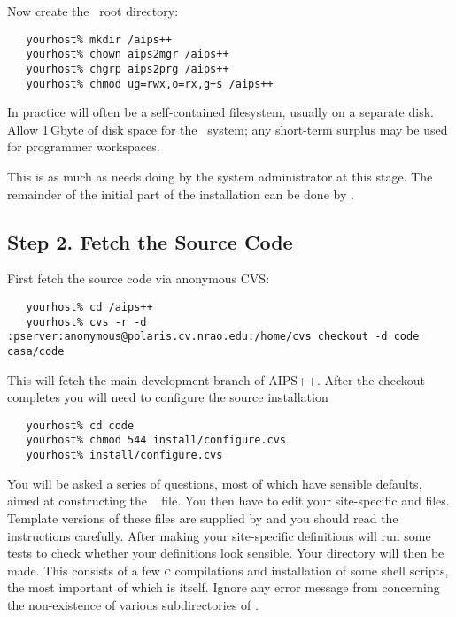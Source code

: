 Now create the \aipspp\ root directory:

\begin{verbatim}
   yourhost% mkdir /aips++
   yourhost% chown aips2mgr /aips++
   yourhost% chgrp aips2prg /aips++
   yourhost% chmod ug=rwx,o=rx,g+s /aips++
\end{verbatim}

\noindent
In practice  will often be a self-contained filesystem, usually
on a separate disk.  Allow 1\,Gbyte of disk space for the \aipspp\ system; any
short-term surplus may be used for programmer workspaces.

This is as much as needs doing by the system administrator at this stage.  The
remainder of the initial part of the installation can be done by
.

\subsection*{Step 2. Fetch the Source Code}

First fetch the source code via anonymous CVS:

\begin{verbatim}
   yourhost% cd /aips++
   yourhost% cvs -r -d :pserver:anonymous@polaris.cv.nrao.edu:/home/cvs checkout -d code casa/code
\end{verbatim}

\noindent
This will fetch the main development branch of AIPS++. After the checkout completes you will
need to configure the source installation

\begin{verbatim}
   yourhost% cd code
   yourhost% chmod 544 install/configure.cvs
   yourhost% install/configure.cvs
\end{verbatim}

\noindent
You will be asked a series of questions, most of which have sensible defaults,
aimed at constructing the \aipspp\  file.  You then have to
edit your site-specific  and  files.  Template
versions of these files are supplied by  and you should read
the instructions carefully.  After making your site-specific definitions
 will run some tests to check whether your 
definitions look sensible.  Your  directory will then be made.
This consists of a few \textsc{c} compilations and installation of some shell
scripts, the most important of which is  itself.  Ignore any
error message from  concerning the non-existence of various
subdirectories of .

